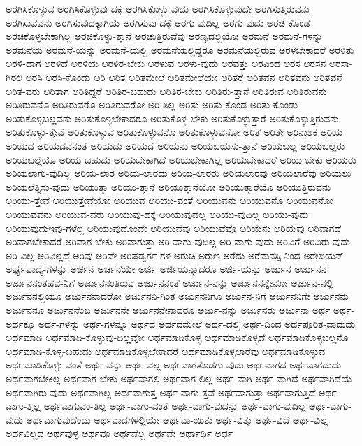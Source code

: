 {ಅರಗಿಸಿಕೊಳ್ಳುವ
ಅರಗಿಸಿಕೊಳ್ಳುವು-ದಕ್ಕೆ
ಅರಗಿಸಿಕೊಳ್ಳು-ವುದು
ಅರಗಿಸಿಕೊಳ್ಳುವುದೇ
ಅರಗಿಸುತ್ತಿರುವನು
ಅರಗಿಸುವವನು
ಅರಗಿಸುವುದಕ್ಕಾಗಿಯೆ
ಅರಗಿಸುವು-ದಕ್ಕೆ
ಅರಗು-ವುದಿಲ್ಲ
ಅರಗು-ವುದು
ಅರಚಿ-ಕೊಂಡ
ಅರಚಿಕೊಳ್ಳಬೇಕಾಗಿಲ್ಲ
ಅರಚಿಕೊಳ್ಳು-ತ್ತಾನೆ
ಅರಚುತ್ತಿರುವೆವು
ಅರಣ್ಯದಲ್ಲಿಯೋ
ಅರಮನೆ
ಅರಮನೆ-ಗಳನ್ನು
ಅರಮನೆಯ
ಅರಮನೆ-ಯನ್ನು
ಅರಮನೆ-ಯಲ್ಲಿ
ಅರಮನೆಯಲ್ಲಿದ್ದರೂ
ಅರಮನೆಯಲ್ಲಿರುವ
ಅರಳಬೇಕಾದರೆ
ಅರಳಿತು
ಅರಳಿ-ದಾಗ
ಅರಳಿದೆ
ಅರಳಿಯ
ಅರಳಿರ-ಬೇಕು
ಅರಳುವ
ಅರಳು-ವುದು
ಅರವತ್ತು
ಅರವಿಂದ
ಅರಸ
ಅರಸನ
ಅರಸಾ-ಗಿರಲಿ
ಅರಸಿ
ಅರಸಿ-ಕೊಂಡು
ಅರಿ
ಅರಿತ
ಅರಿತಮೇಲೆ
ಅರಿತಮೇಲೆಯೇ
ಅರಿತರೆ
ಅರಿತವನ
ಅರಿತವನು
ಅರಿತವನೆ
ಅರಿತ-ವರು
ಅರಿತಾಗ
ಅರಿತಿದ್ದರೆ
ಅರಿತಿರ-ಬಹುದು
ಅರಿತಿರ-ಬೇಕು
ಅರಿತಿರು-ತ್ತಾನೆ
ಅರಿತಿರುವ
ಅರಿತಿರುವನು
ಅರಿತಿರುವನೊ
ಅರಿತಿರುವರೊ
ಅರಿತಿರುವರೋ
ಅರಿ-ತಿಲ್ಲ
ಅರಿತು
ಅರಿತು-ಕೊಂಡ
ಅರಿತು-ಕೊಂಡು
ಅರಿತುಕೊಳ್ಳಬಲ್ಲವನು
ಅರಿತುಕೊಳ್ಳಬೇಕಾದರೂ
ಅರಿತುಕೊಳ್ಳ-ಬೇಕು
ಅರಿತುಕೊಳ್ಳುತ್ತಾರೆ
ಅರಿತುಕೊಳ್ಳುತ್ತಿರುವನು
ಅರಿತುಕೊಳ್ಳು-ತ್ತೇವೆ
ಅರಿತುಕೊಳ್ಳುವ
ಅರಿತುಕೊಳ್ಳುವನೊ
ಅರಿತುಕೊಳ್ಳುವನೋ
ಅರಿತೆ
ಅರಿತೇ
ಅರಿನಾಶಕ
ಅರಿಯ
ಅರಿಯದ
ಅರಿಯದವನಂತೆ
ಅರಿಯದು
ಅರಿಯದೆ
ಅರಿಯನು
ಅರಿಯಬಯಸು-ತ್ತಾನೆ
ಅರಿಯಬಲ್ಲ
ಅರಿಯಬಲ್ಲರು
ಅರಿಯಬಲ್ಲೆಯೊ
ಅರಿಯ-ಬಹುದು
ಅರಿಯಬೇಕಾಗಿದೆ
ಅರಿಯಬೇಕಾಗಿಲ್ಲ
ಅರಿಯಬೇಕಾದರೆ
ಅರಿಯ-ಬೇಕು
ಅರಿಯರು
ಅರಿಯಲಾಗು-ವುದಿಲ್ಲ
ಅರಿಯ-ಲಾರ
ಅರಿಯ-ಲಾರದು
ಅರಿಯ-ಲಾರರು
ಅರಿಯಲಾರವು
ಅರಿಯಲಾರೆವು
ಅರಿಯಲು
ಅರಿಯಲೆತ್ನಿಸು-ವುದು
ಅರಿಯುತ್ತಾ
ಅರಿಯು-ತ್ತಾನೆ
ಅರಿಯುತ್ತಾನೆಯೋ
ಅರಿಯುತ್ತಾರೆಯೊ
ಅರಿಯುತ್ತಿರುವನು
ಅರಿಯು-ತ್ತೇವೆ
ಅರಿಯುತ್ತೇವೆಯೋ
ಅರಿಯುವ
ಅರಿಯು-ವಂತೆ
ಅರಿಯುವನು
ಅರಿಯುವನೊ
ಅರಿಯುವನೋ
ಅರಿಯುವವನು
ಅರಿಯುವ-ವರು
ಅರಿಯುವು-ದಕ್ಕೆ
ಅರಿಯುವುದಲ್ಲ
ಅರಿಯು-ವುದಿಲ್ಲ
ಅರಿಯು-ವುದು
ಅರಿಯುವುದುಇವು-ಗಳೆಲ್ಲ
ಅರಿಯುವುದೊಂದೇ
ಅರಿಯುವೆವು
ಅರಿಯುವೆವೊ
ಅರಿಯೆನು
ಅರಿಯೆವು
ಅರಿವಾಗದೆ
ಅರಿವಾಗಬೇಕಾದರೆ
ಅರಿವಾಗ-ಬೇಕು
ಅರಿವಾಗುತ್ತಾ
ಅರಿ-ವಾಗು-ವುದಿಲ್ಲ
ಅರಿ-ವಾಗು-ವುದು
ಅರಿವಿಗೆ
ಅರಿವಿರು-ವುದು
ಅರಿ-ವಿಲ್ಲ
ಅರಿವಿಲ್ಲದೆ
ಅರಿವು
ಅರಿವೇ
ಅರಿಷಡ್ವರ್ಗ-ಗಳ
ಅರುಚಿ
ಅರುಣ
ಅರೆದು
ಅರೆಮನಸ್ಸಿ-ನಿಂದ
ಅರೇಬಿಯನ್
ಅರ್ಘ್ಯಪಾದ್ಯ-ಗಳನ್ನು
ಅರ್ಚನೆ
ಅರ್ಚನೆಯೇ
ಅರ್ಜಿ
ಅರ್ಜಿಯನ್ನಾದರೂ
ಅರ್ಜಿ-ಯನ್ನು
ಅರ್ಜುನ
ಅರ್ಜುನನ
ಅರ್ಜುನನಂತಹವ-ನಿಗೆ
ಅರ್ಜುನನಂತಿರುವ
ಅರ್ಜುನನಂತೆ
ಅರ್ಜುನ-ನನ್ನು
ಅರ್ಜುನನನ್ನೇನೋ
ಅರ್ಜುನ-ನಲ್ಲಿ
ಅರ್ಜುನನಲ್ಲಿಯೂ
ಅರ್ಜುನನಾದರೋ
ಅರ್ಜುನನಿ-ಗಿಂತ
ಅರ್ಜುನನಿಗೂ
ಅರ್ಜುನ-ನಿಗೆ
ಅರ್ಜುನನಿಗೇ
ಅರ್ಜುನನು
ಅರ್ಜುನನೂ
ಅರ್ಜುನನೆಂಬ
ಅರ್ಜುನನೇ
ಅರ್ಜುನನೇನಾದರೂ
ಅರ್ಜು-ನನ್ನು
ಅರ್ಜುನರು
ಅರ್ಜುನಾ
ಅರ್ಥ
ಅರ್ಥ-
ಅರ್ಥಕ್ಕೂ
ಅರ್ಥ-ಗಳನ್ನು
ಅರ್ಥ-ಗಳನ್ನೂ
ಅರ್ಥದ
ಅರ್ಥದಮೇಲೆ
ಅರ್ಥ-ದಲ್ಲಿ
ಅರ್ಥ-ದಿಂದ
ಅರ್ಥಪೂರಿತ-ವಾದುದು
ಅರ್ಥಮಾಡಿ
ಅರ್ಥಮಾಡಿ-ಕೊಳ್ಳುವು-ದಿಲ್ಲವೋ
ಅರ್ಥಮಾಡಿಕೊಳ್ಳ
ಅರ್ಥಮಾಡಿಕೊಳ್ಳದೆ
ಅರ್ಥಮಾಡಿಕೊಳ್ಳಬಲ್ಲನೊ
ಅರ್ಥಮಾಡಿ-ಕೊಳ್ಳ-ಬಹುದು
ಅರ್ಥಮಾಡಿಕೊಳ್ಳಬೇಕಾದರೆ
ಅರ್ಥಮಾಡಿಕೊಳ್ಳಲಾರೆವು
ಅರ್ಥಮಾಡಿಕೊಳ್ಳುವ
ಅರ್ಥಮಾಡಿಕೊಳ್ಳು-ವಂತೆ
ಅರ್ಥ-ವನ್ನು
ಅರ್ಥ-ವಲ್ಲ
ಅರ್ಥವಾಗತೊಡಗು-ವುದು
ಅರ್ಥವಾಗದ
ಅರ್ಥವಾಗದುದು
ಅರ್ಥವಾಗಬೇಕಿಲ್ಲ
ಅರ್ಥವಾಗ-ಬೇಕು
ಅರ್ಥವಾಗಲಿ
ಅರ್ಥವಾಗ-ಲಿಲ್ಲ
ಅರ್ಥ-ವಾಗಿ
ಅರ್ಥ-ವಾಗಿದೆ
ಅರ್ಥವಾಗಿದೆಯೆ
ಅರ್ಥವಾಗಿರು-ವುದು
ಅರ್ಥವಾಗಿಲ್ಲ
ಅರ್ಥವಾಗುತ್ತ
ಅರ್ಥ-ವಾಗು-ತ್ತವೆ
ಅರ್ಥವಾಗುತ್ತಾ
ಅರ್ಥವಾಗುತ್ತಿದೆ
ಅರ್ಥ-ವಾಗು-ತ್ತಿಲ್ಲ
ಅರ್ಥವಾಗುವಂ-ತಿಲ್ಲ
ಅರ್ಥ-ವಾಗು-ವಂತೆ
ಅರ್ಥ-ವಾಗು-ವುದನ್ನು
ಅರ್ಥ-ವಾಗು-ವುದಿಲ್ಲ
ಅರ್ಥ-ವಾಗು-ವುದು
ಅರ್ಥವಾಗುವುದೆಂದು
ಅರ್ಥವಾದಗಳಲ್ಲಿಯೇ
ಅರ್ಥವಾ-ಯಿತು
ಅರ್ಥ-ವಿತ್ತು
ಅರ್ಥ-ವಿದೆ
ಅರ್ಥ-ವಿಲ್ಲ
ಅರ್ಥವಿಲ್ಲದ
ಅರ್ಥವುಳ್ಳ
ಅರ್ಥವೂ
ಅರ್ಥವೆಲ್ಲ
ಅರ್ಥವೇ
ಅರ್ಥಾರ್ಥಿ
ಅರ್ಧ
}

